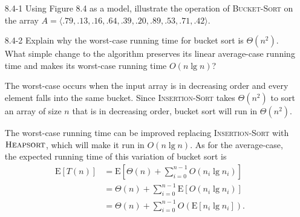 \begin{enumerate}

\item[8.4-1]{Using Figure 8.4 as a model, illustrate the operation of
\textsc{Bucket-Sort} on the array
$A = \langle .79, .13, .16, .64, .39, .20, .89, .53, .71, .42 \rangle$.}

\begin{framed}
\begin{center}
\qquad
{}
\end{center}
\end{framed}

\item[8.4-2]{Explain why the worst-case running time for bucket sort is
$\Theta(n^2)$. What simple change to the algorithm preserves its linear
average-case running time and makes its worst-case running time $O(n \lg n)$?}

\begin{framed}
The worst-case occurs when the input array is in decreasing order and every
element falls into the same bucket. Since \textsc{Insertion-Sort} takes
$\Theta(n^2)$ to sort an array of size $n$ that is in decreasing order, bucket
sort will run in $\Theta(n^2)$.

The worst-case running time can be improved replacing \textsc{Insertion-Sort}
with $\textsc{Heapsort}$, which will make it run in $O(n \lg n)$. As for the
average-case, the expected running time of this variation of bucket sort is
\begin{equation*}
\begin{aligned}
  \text{E}[T(n)] &= \text{E}\left[ \Theta(n) + \sum_{i = 0}^{n - 1} O(n_i \lg n_i) \right]\\
                 &= \Theta(n) + \sum_{i = 0}^{n - 1} \text{E}[O(n_i \lg n_i)]\\
                 &= \Theta(n) + \sum_{i = 0}^{n - 1} O(\text{E}[n_i \lg n_i]).
\end{aligned}
\end{equation*}


\end{framed}
\end{enumerate}
